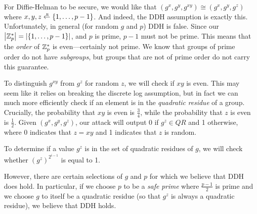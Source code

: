 For Diffie-Helman to be secure, we would like that $(g^x, g^y, g^{xy}) \cong (g^x, g^y, g^z)$ where $x, y, z \rgets \set{1, \ldots, p-1}$. And indeed, the DDH assumption is exactly this. Unfortunately, in general (for random $g$ and $p$) DDH is false. Since our $\left| \mathbb{Z}_p^* \right| = \left| \left\{ 1, \ldots, p-1 \right\} \right|$, and $p$ is prime, $p-1$ must not be prime. This means that the \emph{order} of $\mathbb{Z}_p^*$ is even---certainly not prime. We know that groups of prime order do not have \emph{subgroups}, but groups that are not of prime order do not carry this guarantee.

To distinguish $g^{xy}$ from $g^z$ for random $z$, we will check if $xy$ is even. This may seem like it relies on breaking the discrete log assumption, but in fact we can much more efficiently check if an element is in the \emph{quadratic residue} of a group. Crucially, the probability that $xy$ is even is $\tfrac{3}{4}$, while the probability that $z$ is even is $\tfrac{1}{2}$. Given $(g^x, g^y, g^z)$, our attack will output 0 if $g^z \in QR$ and 1 otherwise, where 0 indicates that $z = xy$ and 1 indicates that $z$ is random.

To determine if a value $g^z$ is in the set of quadratic residues of $g$, we will check whether $(g^z)^{2^{i-1}}$ is equal to 1.

However, there are certain selections of $g$ and $p$ for which we believe that DDH does hold. In particular, if we choose $p$ to be a \emph{safe prime} where $\frac{p-1}{2}$ is prime and we choose $g$ to itself be a quadratic residue (so that $g^z$ is always a quadratic residue), we believe that DDH holds.
